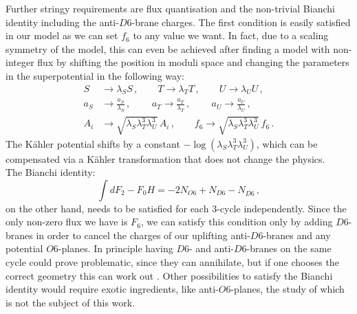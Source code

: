 \documentclass[a4paper,12pt]{report}
\newcommand{\be}{\begin{equation}}
\newcommand{\ee}{\end{equation}}
\newcommand{\bea}{\begin{equation}\begin{aligned}}
\newcommand{\eea}{\end{aligned}\end{equation}}
\begin{document}
Further stringy requirements are flux quantisation and the non-trivial Bianchi identity including the anti-$D6$-brane charges. The first condition is easily satisfied in our model as we can set $f_6$ to any value we want. In fact, due to a scaling symmetry of the model, this can even be achieved after finding a model with non-integer flux by shifting the position in moduli space and  changing the parameters in the superpotential in the following way:
\bea 
S &\to \lambda_S S\,, \qquad T \to \lambda_T T\,, \qquad U\to \lambda_U U\,,\\
a_S &\to \frac{a_S }{\lambda_S}\,,\qquad\, a_T \to \frac{a_T }{\lambda_T}\,,\qquad\, a_U \to \frac{a_U }{\lambda_U}\,,\\
A_i &\to \sqrt{\lambda_S \lambda_T^3 \lambda_U^3}\, A_i\,,\qquad f_6 \to \sqrt{\lambda_S \lambda_T^3 \lambda_U^3}\, f_6\,.
\eea
The Kähler potential shifts by a constant $-\log (\lambda_S \lambda_T^3 \lambda_U^3)$, which can be compensated via a Kähler transformation that does not change the physics.\\
The Bianchi identity:
\be 
\int dF_2 - F_0 H = -2 N_{O6} + N_{D6} - N_{\overline{D6}}\,,
\ee
on the other hand, needs to be satisfied for each 3-cycle independently. Since the only non-zero flux we have is $F_6$, we can satisfy this condition only by adding $D6$-branes in order to cancel the charges of our uplifting anti-$D6$-branes and any potential $O6$-planes. In principle having $D6$- and anti-$D6$-branes on the same cycle could prove problematic, since they can annihilate, but if one chooses the correct geometry this can work out \cite{Retolaza:2015sta}. Other possibilities to satisfy the Bianchi identity would require exotic ingredients, like anti-$O6$-planes, the study of which is not the subject of this work.
\end{document}
